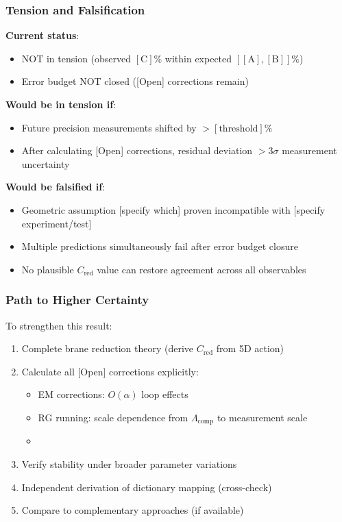 \subsubsection{Tension and Falsification}

\textbf{Current status}:
\begin{itemize}
\item NOT in tension (observed $[\text{C}]\%$ within expected $[[\text{A}], [\text{B}]]\%$)
\item Error budget NOT closed ([Open] corrections remain)
\end{itemize}

\textbf{Would be in tension if}:
\begin{itemize}
\item Future precision measurements shifted by $> [\text{threshold}]\%$
\item After calculating [Open] corrections, residual deviation $> 3\sigma$ measurement uncertainty
\end{itemize}

\textbf{Would be falsified if}:
\begin{itemize}
\item Geometric assumption [specify which] proven incompatible with [specify experiment/test]
\item Multiple predictions simultaneously fail after error budget closure
\item No plausible $C_{\mathrm{red}}$ value can restore agreement across all observables
\end{itemize}


\subsubsection{Path to Higher Certainty}

To strengthen this result:
\begin{enumerate}
\item Complete brane reduction theory (derive $C_{\mathrm{red}}$ from 5D action)
\item Calculate all [Open] corrections explicitly:
  \begin{itemize}
  \item EM corrections: $O(\alpha)$ loop effects
  \item RG running: scale dependence from $\Lambda_{\text{comp}}$ to measurement scale
  \item [Other corrections as listed in error budget]
  \end{itemize}
\item Verify stability under broader parameter variations
\item Independent derivation of dictionary mapping (cross-check)
\item Compare to complementary approaches (if available)
\end{enumerate}

